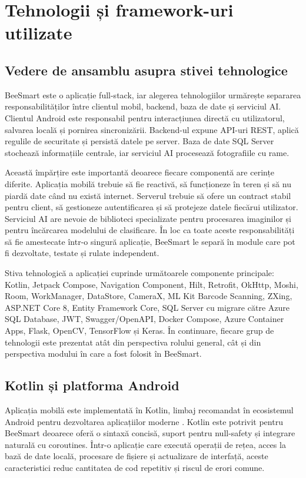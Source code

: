 \chapter{Tehnologii și framework-uri utilizate}
\label{chap:tehnologii}

\section{Vedere de ansamblu asupra stivei tehnologice}

BeeSmart este o aplicație full-stack, iar alegerea tehnologiilor urmărește separarea responsabilităților între clientul mobil, backend, baza de date și serviciul AI. Clientul Android este responsabil pentru interacțiunea directă cu utilizatorul, salvarea locală și pornirea sincronizării. Backend-ul expune API-uri REST, aplică regulile de securitate și persistă datele pe server. Baza de date SQL Server stochează informațiile centrale, iar serviciul AI procesează fotografiile cu rame.

Această împărțire este importantă deoarece fiecare componentă are cerințe diferite. Aplicația mobilă trebuie să fie reactivă, să funcționeze în teren și să nu piardă date când nu există internet. Serverul trebuie să ofere un contract stabil pentru client, să gestioneze autentificarea și să protejeze datele fiecărui utilizator. Serviciul AI are nevoie de biblioteci specializate pentru procesarea imaginilor și pentru încărcarea modelului de clasificare. În loc ca toate aceste responsabilități să fie amestecate într-o singură aplicație, BeeSmart le separă în module care pot fi dezvoltate, testate și rulate independent.

Stiva tehnologică a aplicației cuprinde următoarele componente principale: Kotlin, Jetpack Compose, Navigation Component, Hilt, Retrofit, OkHttp, Moshi, Room, WorkManager, DataStore, CameraX, ML Kit Barcode Scanning, ZXing, ASP.NET Core 8, Entity Framework Core, SQL Server cu migrare către Azure SQL Database, JWT, Swagger/OpenAPI, Docker Compose, Azure Container Apps, Flask, OpenCV, TensorFlow și Keras. În continuare, fiecare grup de tehnologii este prezentat atât din perspectiva rolului general, cât și din perspectiva modului în care a fost folosit în BeeSmart.

\section{Kotlin și platforma Android}

Aplicația mobilă este implementată în Kotlin, limbaj recomandat în ecosistemul Android pentru dezvoltarea aplicațiilor moderne \cite{kotlinDocs}. Kotlin este potrivit pentru BeeSmart deoarece oferă o sintaxă concisă, suport pentru null-safety și integrare naturală cu coroutines. Într-o aplicație care execută operații de rețea, acces la bază de date locală, procesare de fișiere și actualizare de interfață, aceste caracteristici reduc cantitatea de cod repetitiv și riscul de erori comune.

